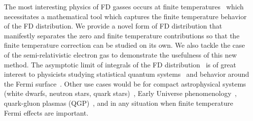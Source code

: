 \documentclass[sn-mathphys,Numbered]{sn-jnl}
\newcommand{\rsec}[1]{Sec.~{\ref{#1}}}
\begin{document}
The most interesting physics of FD gasses occurs at finite temperatures~\cite{bludman1977equation,Elze:1980er} which necessitates a mathematical tool which captures the finite temperature behavior of the FD distribution. We provide a novel form of FD distribution that manifestly separates the zero and finite temperature contributions so that the finite temperature correction can be studied on its own. We also tackle the case of the semi-relativistic electron gas to demonstrate the usefulness of this new method. The asymptotic limit of integrals of the FD distribution~\cite{dingle1957fermi,dingle1973asymptotic} is of great interest to physicists studying statistical quantum systems~\cite{10.1063/1.1350634,10.1142/S021827180701002X,10.1063/1.1665160,FUKUSHIMA2014417,GIL2022126618,GIL2023108563} and behavior around the Fermi surface~\cite{kim2008notes,PhysRevB.103.205154}. Other use cases would be for compact astrophysical systems (white dwarfs, neutron stars, quark stars)~\cite{Kaspi:2017fwg,Ferrer:2019xlr,Ferrer:2023pgq}, Early Universe phenomenology~\cite{Rafelski:2021aey,Rafelski:2023emw,Grayson:2023flr,Steinmetz:2023nsc}, quark-gluon plasmas (QGP)~\cite{Letessier:2002ony,Rafelski:2020ajx,Yang:2021bko}, and in any situation when finite temperature Fermi effects are important.

\end{document}
